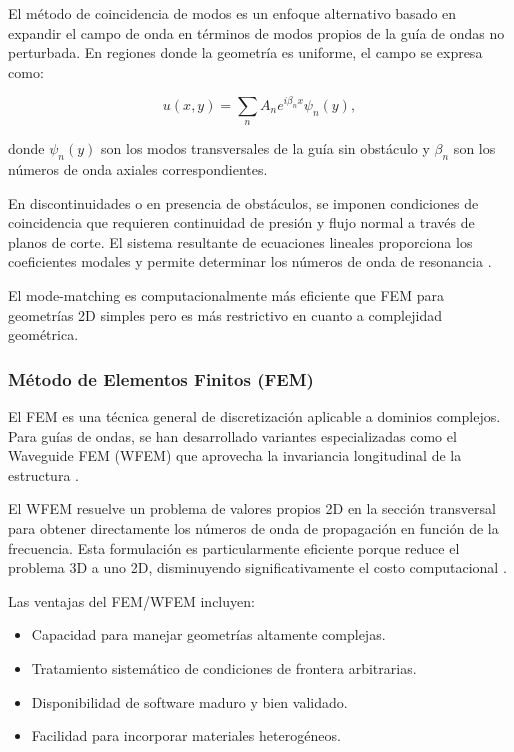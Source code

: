 \documentclass[11pt]{article}
\begin{document}
El método de coincidencia de modos es un enfoque alternativo basado en expandir el campo de onda en términos de modos propios de la guía de ondas no perturbada. En regiones donde la geometría es uniforme, el campo se expresa como:

\begin{equation}
u(x,y) = \sum_{n} A_n e^{i\beta_n x} \psi_n(y),
\end{equation}

donde $\psi_n(y)$ son los modos transversales de la guía sin obstáculo y $\beta_n$ son los números de onda axiales correspondientes.

En discontinuidades o en presencia de obstáculos, se imponen condiciones de coincidencia que requieren continuidad de presión y flujo normal a través de planos de corte. El sistema resultante de ecuaciones lineales proporciona los coeficientes modales y permite determinar los números de onda de resonancia \cite{Klaren1994, Alkuhayli2025}.

El mode-matching es computacionalmente más eficiente que FEM para geometrías 2D simples pero es más restrictivo en cuanto a complejidad geométrica.

\subsubsection{Método de Elementos Finitos (FEM)}

El FEM es una técnica general de discretización aplicable a dominios complejos. Para guías de ondas, se han desarrollado variantes especializadas como el Waveguide FEM (WFEM) que aprovecha la invariancia longitudinal de la estructura \cite{Finnveden2012}.

El WFEM resuelve un problema de valores propios 2D en la sección transversal para obtener directamente los números de onda de propagación en función de la frecuencia. Esta formulación es particularmente eficiente porque reduce el problema 3D a uno 2D, disminuyendo significativamente el costo computacional \cite{Dostart2017}.

Las ventajas del FEM/WFEM incluyen:
\begin{itemize}
\item Capacidad para manejar geometrías altamente complejas.
\item Tratamiento sistemático de condiciones de frontera arbitrarias.
\item Disponibilidad de software maduro y bien validado.
\item Facilidad para incorporar materiales heterogéneos.
\end{itemize}
\end{document}
